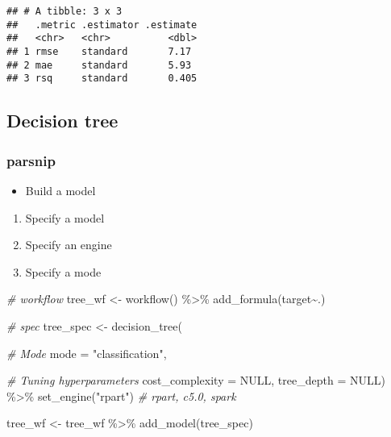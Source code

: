 \documentclass[
]{book}
\newenvironment{Shaded}{\begin{snugshade}}{\end{snugshade}}
\newcommand{\AttributeTok}[1]{\textcolor[rgb]{0.77,0.63,0.00}{#1}}
\newcommand{\CommentTok}[1]{\textcolor[rgb]{0.56,0.35,0.01}{\textit{#1}}}
\newcommand{\ConstantTok}[1]{\textcolor[rgb]{0.00,0.00,0.00}{#1}}
\newcommand{\FunctionTok}[1]{\textcolor[rgb]{0.00,0.00,0.00}{#1}}
\newcommand{\NormalTok}[1]{#1}
\newcommand{\OtherTok}[1]{\textcolor[rgb]{0.56,0.35,0.01}{#1}}
\newcommand{\SpecialCharTok}[1]{\textcolor[rgb]{0.00,0.00,0.00}{#1}}
\newcommand{\StringTok}[1]{\textcolor[rgb]{0.31,0.60,0.02}{#1}}
\providecommand{\tightlist}{%
  \setlength{\itemsep}{0pt}\setlength{\parskip}{0pt}}
\begin{document}
\begin{verbatim}
## # A tibble: 3 x 3
##   .metric .estimator .estimate
##   <chr>   <chr>          <dbl>
## 1 rmse    standard       7.17 
## 2 mae     standard       5.93 
## 3 rsq     standard       0.405
\end{verbatim}

\hypertarget{decision-tree}{%
\subsection{Decision tree}\label{decision-tree}}

\hypertarget{parsnip-1}{%
\subsubsection{parsnip}\label{parsnip-1}}

\begin{itemize}
\tightlist
\item
  Build a model
\end{itemize}

\begin{enumerate}
\def\labelenumi{\arabic{enumi}.}
\tightlist
\item
  Specify a model
\item
  Specify an engine
\item
  Specify a mode
\end{enumerate}

\begin{Shaded}
\begin{Highlighting}[]
\CommentTok{\# workflow }
\NormalTok{tree\_wf }\OtherTok{\textless{}{-}} \FunctionTok{workflow}\NormalTok{() }\SpecialCharTok{\%\textgreater{}\%} \FunctionTok{add\_formula}\NormalTok{(target}\SpecialCharTok{\textasciitilde{}}\NormalTok{.)}

\CommentTok{\# spec }
\NormalTok{tree\_spec }\OtherTok{\textless{}{-}} \FunctionTok{decision\_tree}\NormalTok{(}
  
           \CommentTok{\# Mode }
           \AttributeTok{mode =} \StringTok{"classification"}\NormalTok{,}
           
           \CommentTok{\# Tuning hyperparameters}
           \AttributeTok{cost\_complexity =} \ConstantTok{NULL}\NormalTok{, }
           \AttributeTok{tree\_depth =} \ConstantTok{NULL}\NormalTok{) }\SpecialCharTok{\%\textgreater{}\%}
  \FunctionTok{set\_engine}\NormalTok{(}\StringTok{"rpart"}\NormalTok{) }\CommentTok{\# rpart, c5.0, spark}

\NormalTok{tree\_wf }\OtherTok{\textless{}{-}}\NormalTok{ tree\_wf }\SpecialCharTok{\%\textgreater{}\%} \FunctionTok{add\_model}\NormalTok{(tree\_spec)}
\end{Highlighting}
\end{Shaded}
\end{document}

